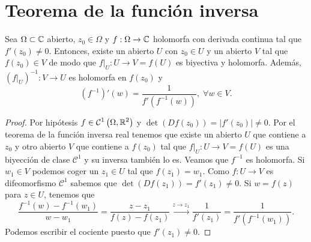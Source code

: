 \section{Teorema de la función inversa}
\begin{theorem}
Sea $\displaystyle \Omega \subset \mathbb{C} $ abierto, $\displaystyle z_{0} \in \Omega  $ y $\displaystyle f : \Omega \to \mathbb{C} $ holomorfa con derivada continua tal que $\displaystyle f'\left(z_{0}\right)\neq 0 $. Entonces, existe un abierto $\displaystyle U $ con $\displaystyle z_{0} \in U $ y un abierto $\displaystyle V $ tal que $\displaystyle f\left(z_{0}\right)\in V $ de modo que $\displaystyle f|_{U} : U \to V=f\left(U\right) $ es biyectiva y holomorfa. Además, $\displaystyle \left(f|_{U}\right)^{-1} : V \to U $ es holomorfa en $\displaystyle f\left(z_{0}\right) $ y
\[\left(f^{-1}\right)'\left(w\right)=\frac{1}{f'\left(f^{-1}\left(w\right)\right)}, \; \forall w \in V .\]
\end{theorem}
\begin{proof}
Por hipótesis $\displaystyle f \in \mathcal{C}^{1}\left(\Omega, \mathbb{R}^{2}\right) $ y $\displaystyle \det\left(Df\left(z_{0}\right)\right)= \left|f'\left(z_{0}\right)\right|\neq0 $. Por el teorema de la función inversa real tenemos que existe un abierto $\displaystyle U $ que contiene a $\displaystyle z_{0} $ y otro abierto $\displaystyle V $ que contiene a $\displaystyle f\left(z_{0}\right) $ tal que $\displaystyle f|_{U}: U \to V=f\left(U\right) $ es una biyección de clase $\displaystyle \mathcal{C}^{1} $ y su inversa también lo es.
Veamos que $\displaystyle f^{-1} $ es holomorfa. Si $\displaystyle w_{1} \in V $ podemos coger un $\displaystyle z_{1} \in U $ tal que $\displaystyle f\left(z_{1}\right)=w_{1} $. Como $\displaystyle f : U \to V $ es difeomorfismo $\displaystyle \mathcal{C}^{1} $ sabemos que $\displaystyle \det\left(Df\left(z_{1}\right)\right)=f'\left(z_{1}\right)\neq 0 $.
Si $\displaystyle w = f\left(z\right) $ para $\displaystyle z \in U $, tenemos que 
\[\frac{f^{-1}\left(w\right)-f^{-1}\left(w_{1}\right)}{w-w_{1}}=\frac{z-z_{1}}{f\left(z\right)-f\left(z_{1}\right)}\xrightarrow{z \to z_{1}} \frac{1}{f'\left(z_{1}\right)}=\frac{1}{f'\left(f^{-1}\left(w_{1}\right)\right)} .\]
Podemos escribir el cociente puesto que $\displaystyle f'\left(z_{1}\right)\neq 0 $. 
\end{proof}
